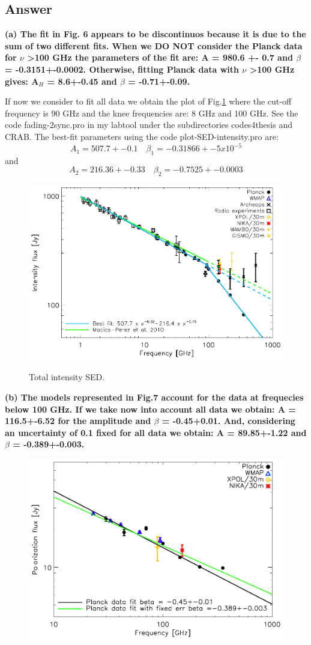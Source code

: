 \documentclass[report,onecolumn]{aa}
\begin{document}
\subsection{\textbf{Answer}}
\textbf{(a)  The fit in Fig. 6 appears to be discontinuos because it is due to the sum of two different fits. When we DO NOT consider the Planck data for $\nu$ \textgreater 100 GHz the parameters of the fit are: A = 980.6 +- 0.7 and $\beta$ = -0.3151+-0.0002.
Otherwise, fitting Planck data with $\nu$ \textgreater 100 GHz gives: A$_H$ = 8.6+-0.45 and $\beta$ = -0.71+-0.09.}

{\color{blue} If now we consider to fit all data we obtain the plot of Fig.\ref{crab_int_SED}
where the cut-off frequency is 90 GHz and the knee frequencies are: 8 GHz and 100 GHz. See the code fading-2sync.pro in my labtool under the subdirectories codes4thesis and CRAB.
The best-fit parameters using the code plot-SED-intensity.pro are:
} 
 \begin{equation}
 A_1 = 507.7+-0.1 \quad \beta_1 = -0.31866+-5x10^{-5} \nonumber
 \end{equation}
 and
 \begin{equation}
 A_2 = 216.36+-0.33 \quad \beta_2 = -0.7525+-0.0003
 \end{equation}



\begin{figure}[!ht]
\centering
     	  { \includegraphics[width=0.5\linewidth,keepaspectratio]{referee_figures/Crab_SED_int_test.pdf}}
\caption{Total intensity SED.}     	  
 
\label{crab_int_SED}
\end{figure}


\textbf{(b) The models represented in Fig.7 account for the data at frequecies below 100 GHz. If we take now into account all data we obtain:
A = 116.5+-6.52 for the amplitude and $\beta$ = -0.45+0.01.
And, considering an uncertainty of 0.1 fixed for all data we obtain:
A = 89.85+-1.22 and $\beta$ = -0.389+-0.003.}
\begin{figure}[h!]
  \centering
     	  { \includegraphics[width=0.5\linewidth,keepaspectratio]{referee_figures/Crab_SED_ipol_test.pdf}}
     	\label{crab_polar_SED}
\end{figure}
  
\end{document}
